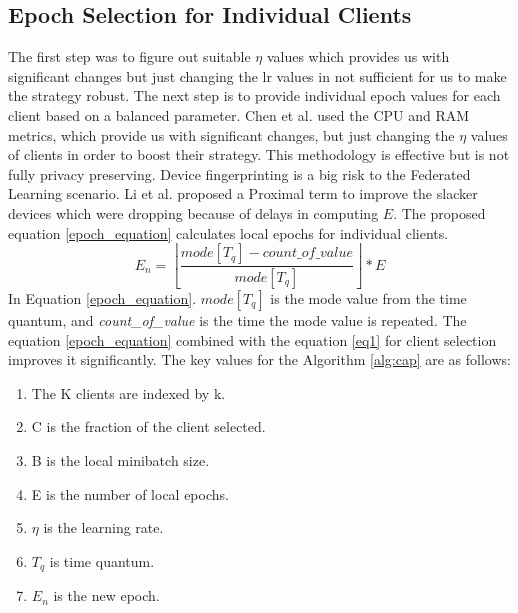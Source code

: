 \documentclass[conference]{IEEEtran}
\begin{document}
\subsection{Epoch Selection for Individual Clients}
The first step was to figure out suitable $\eta$ values which provides us with significant changes but just changing the lr values in not sufficient for us to make the strategy robust. The next step is to provide individual epoch values for each client based on a balanced parameter. Chen et al. \cite{chen2023boosting} used the CPU and RAM metrics, which provide us with significant changes, but just changing the $\eta$ values of clients in order to boost their strategy. This methodology is effective but is not fully privacy preserving. Device fingerprinting is a big risk to the Federated Learning scenario.  Li et al. \cite{li2020federated} proposed a Proximal term to improve the slacker devices which were dropping because of delays in computing $E$. The proposed equation \ref{epoch_equation} calculates local epochs for individual clients.
\begin{equation}
	E_n = \left \lfloor\frac{mode[T_q] - count\_of\_value}{mode[T_q]}\right \rfloor * E 
	\label{epoch_equation}
\end{equation}
In Equation \ref{epoch_equation}.\textit{ $mode[T_q]$} is the mode value from the time quantum, and \textit{count\_of\_value} is the time the mode value is repeated. The equation \ref{epoch_equation} combined with the equation \ref{eq1} for client selection improves it significantly.
The key values for the Algorithm \ref{alg:cap} are as follows:
\begin{enumerate}
	\item The K clients are indexed by k.
	\item C is the fraction of the client selected.
	\item B is the local minibatch size.
	\item E is the number of local epochs.
	\item $\eta$ is the learning rate.
	\item $T_q$ is time quantum.
	\item $E_n$ is the new epoch.
\end{enumerate}
\end{document}

